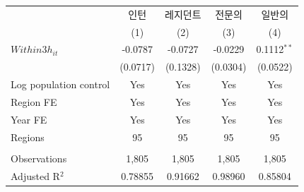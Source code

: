 \begingroup
\centering
\begin{tabular}{lcccc}
   \toprule
                          & 인턴     & 레지던트 & 전문의   & 일반의 \\   
                          & (1)      & (2)      & (3)      & (4)\\  
   \midrule 
   $Within3h_{it}$        & -0.0787  & -0.0727  & -0.0229  & 0.1112$^{**}$\\   
                          & (0.0717) & (0.1328) & (0.0304) & (0.0522)\\   
   Log population control & Yes      & Yes      & Yes      & Yes\\  
   Region FE              & Yes      & Yes      & Yes      & Yes\\  
   Year FE                & Yes      & Yes      & Yes      & Yes\\  
   Regions                & 95       & 95       & 95       & 95\\  
    \\
   Observations           & 1,805    & 1,805    & 1,805    & 1,805\\  
   Adjusted R$^2$         & 0.78855  & 0.91662  & 0.98960  & 0.85804\\  
   \bottomrule
\end{tabular}
\par\endgroup
